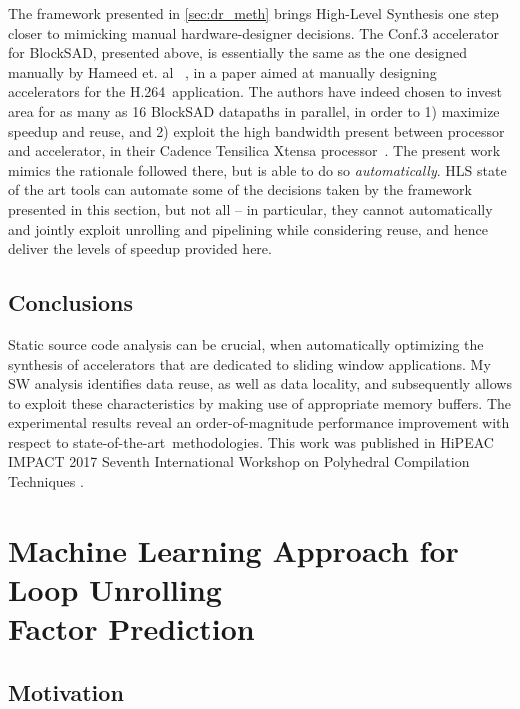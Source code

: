 \documentclass[]{usiinfthesis}
\newcommand{\htsf}{{H.264}}
\newcommand{\SoTA}{{state-of-the-art}}
\begin{document}
The framework presented in \ref{sec:dr_meth} brings High-Level Synthesis
   one step closer to mimicking manual hardware-designer
   decisions. The Conf.3 accelerator for BlockSAD, presented above,
 is essentially the same as the one designed manually by Hameed et. al
 ~\cite{HameedOct11}, in a paper aimed at manually designing
 accelerators for the \htsf\ application. The authors have indeed chosen
 to invest area for as many as 16 BlockSAD datapaths in parallel, in
 order to 1) maximize speedup and reuse, and 2) exploit the high
 bandwidth present between processor and accelerator, in their Cadence
 Tensilica Xtensa processor~\cite{TensilicaWeb}. The present work
 mimics the rationale followed there, but is able to do so
 \emph{automatically}. HLS state of the art tools can automate some of
 the decisions taken by the framework presented in this section, but not 
 all -- in particular,
 they cannot automatically and jointly exploit unrolling and
 pipelining while considering reuse, and hence deliver the levels of
 speedup provided here.


\subsection{Conclusions}

Static source code analysis can be crucial, when 
automatically optimizing the synthesis of accelerators that are dedicated to 
sliding window applications. My SW analysis identifies data reuse, as well as data locality,
and subsequently allows to exploit these characteristics by making use of appropriate
memory buffers. The experimental results reveal an order-of-magnitude performance 
improvement with respect to \SoTA\ methodologies. This work was published in 
HiPEAC IMPACT 2017 Seventh International Workshop on Polyhedral Compilation Techniques 
\cite{ZacharopoulosJan17}. 

\newpage


%
%
%

\section[Machine Learning Approach for Loop Unrolling\\ Factor Prediction]
{Machine Learning Approach for Loop Unrolling\\ Factor Prediction}
\label{sec:ml}

\subsection{Motivation}
\end{document}

